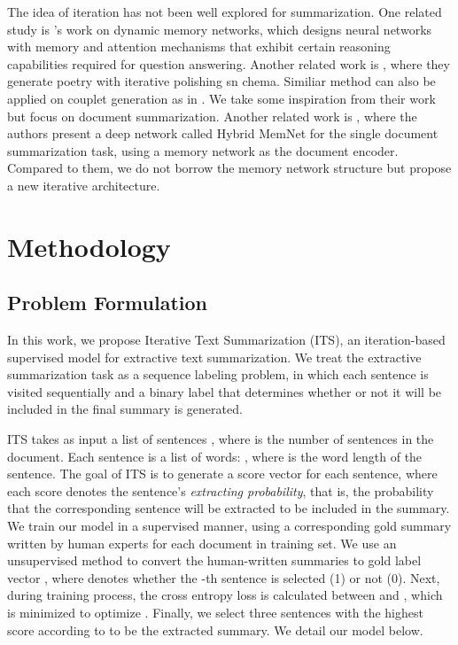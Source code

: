 \documentclass[11pt,a4paper]{article}
\begin{document}
The idea of iteration has not been well explored for summarization. 
One related study is \citet{Xiong2016Dynamic}'s work on dynamic memory networks, which designs neural networks with memory and attention mechanisms that exhibit certain reasoning capabilities required for question answering. 
Another related work is \cite{yan2016poet}, where they generate poetry with iterative polishing sn
chema. Similiar method can also be applied on couplet generation as in \cite{Yan2016Chinese}.
We take some inspiration from their work but focus on document summarization.
Another related work is \cite{Singh2017Hybrid}, where the authors present a deep network called Hybrid MemNet for the single document summarization task, using a memory network as the document encoder. 
Compared to them, we do not borrow the memory network structure but propose a new iterative architecture.


%
 
\section{Methodology}

\subsection{Problem Formulation}
In this work, we propose Iterative Text Summarization (ITS), an iteration-based supervised model for extractive text summarization. 
We treat the extractive summarization task as a sequence labeling problem, in which each sentence is visited sequentially and a binary label that determines whether or not it will be included in the final summary is generated.

ITS takes as input a list of sentences , where  is the number of sentences in the document. Each sentence  is a list of words: , where  is the word length of the sentence.
The goal of ITS is to generate a score vector  for each sentence, where each score  denotes the sentence's \textit{extracting probability}, that is, the probability that the corresponding sentence  will be extracted to be included in the summary. 
We train our model in a supervised manner, using a corresponding gold summary written by human experts for each document in training set. We use an unsupervised method to convert the human-written summaries to gold label vector , where  denotes whether the -th sentence is selected (1) or not (0).
Next, during training process, the cross entropy loss is calculated between  and , which is minimized to optimize .
Finally, we select three sentences with the highest score according to  to be the extracted summary. 
We detail our model below.
\end{document}

